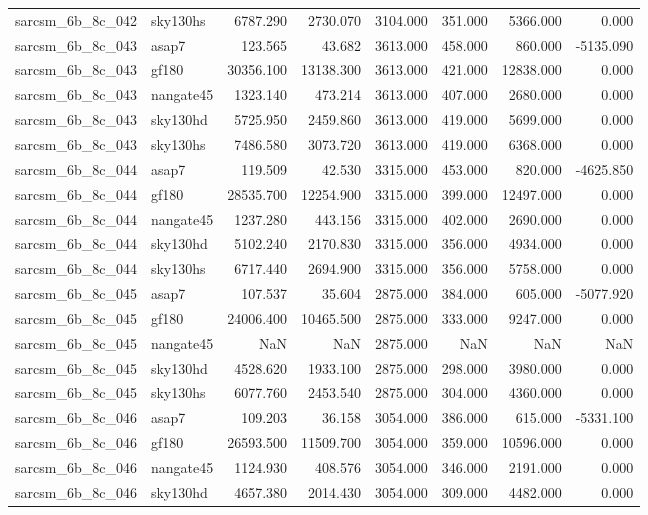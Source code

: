 \begin{tabular}{llrrrrrr}
sarcsm\_6b\_8c\_042 & sky130hs & 6787.290 & 2730.070 & 3104.000 & 351.000 & 5366.000 & 0.000 \\
sarcsm\_6b\_8c\_043 & asap7 & 123.565 & 43.682 & 3613.000 & 458.000 & 860.000 & -5135.090 \\
sarcsm\_6b\_8c\_043 & gf180 & 30356.100 & 13138.300 & 3613.000 & 421.000 & 12838.000 & 0.000 \\
sarcsm\_6b\_8c\_043 & nangate45 & 1323.140 & 473.214 & 3613.000 & 407.000 & 2680.000 & 0.000 \\
sarcsm\_6b\_8c\_043 & sky130hd & 5725.950 & 2459.860 & 3613.000 & 419.000 & 5699.000 & 0.000 \\
sarcsm\_6b\_8c\_043 & sky130hs & 7486.580 & 3073.720 & 3613.000 & 419.000 & 6368.000 & 0.000 \\
sarcsm\_6b\_8c\_044 & asap7 & 119.509 & 42.530 & 3315.000 & 453.000 & 820.000 & -4625.850 \\
sarcsm\_6b\_8c\_044 & gf180 & 28535.700 & 12254.900 & 3315.000 & 399.000 & 12497.000 & 0.000 \\
sarcsm\_6b\_8c\_044 & nangate45 & 1237.280 & 443.156 & 3315.000 & 402.000 & 2690.000 & 0.000 \\
sarcsm\_6b\_8c\_044 & sky130hd & 5102.240 & 2170.830 & 3315.000 & 356.000 & 4934.000 & 0.000 \\
sarcsm\_6b\_8c\_044 & sky130hs & 6717.440 & 2694.900 & 3315.000 & 356.000 & 5758.000 & 0.000 \\
sarcsm\_6b\_8c\_045 & asap7 & 107.537 & 35.604 & 2875.000 & 384.000 & 605.000 & -5077.920 \\
sarcsm\_6b\_8c\_045 & gf180 & 24006.400 & 10465.500 & 2875.000 & 333.000 & 9247.000 & 0.000 \\
sarcsm\_6b\_8c\_045 & nangate45 & NaN & NaN & 2875.000 & NaN & NaN & NaN \\
sarcsm\_6b\_8c\_045 & sky130hd & 4528.620 & 1933.100 & 2875.000 & 298.000 & 3980.000 & 0.000 \\
sarcsm\_6b\_8c\_045 & sky130hs & 6077.760 & 2453.540 & 2875.000 & 304.000 & 4360.000 & 0.000 \\
sarcsm\_6b\_8c\_046 & asap7 & 109.203 & 36.158 & 3054.000 & 386.000 & 615.000 & -5331.100 \\
sarcsm\_6b\_8c\_046 & gf180 & 26593.500 & 11509.700 & 3054.000 & 359.000 & 10596.000 & 0.000 \\
sarcsm\_6b\_8c\_046 & nangate45 & 1124.930 & 408.576 & 3054.000 & 346.000 & 2191.000 & 0.000 \\
sarcsm\_6b\_8c\_046 & sky130hd & 4657.380 & 2014.430 & 3054.000 & 309.000 & 4482.000 & 0.000 \\

\end{tabular}
